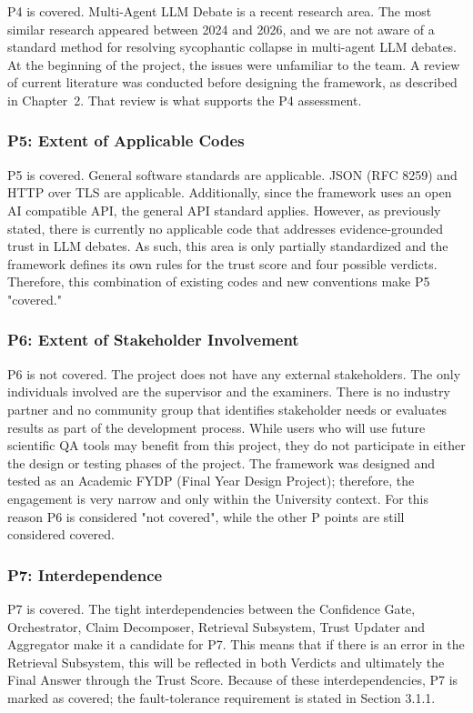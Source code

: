 P4 is covered. Multi-Agent LLM Debate is a recent research area. The most similar research appeared between 2024 and 2026, and we are not aware of a standard method for resolving sycophantic collapse in multi-agent LLM debates. At the beginning of the project, the issues were unfamiliar to the team. A review of current literature was conducted before designing the framework, as described in Chapter~2. That review is what supports the P4 assessment.

\subsubsection{P5: Extent of Applicable Codes}

P5 is covered. General software standards are applicable. JSON (RFC 8259) and HTTP over TLS are applicable. Additionally, since the framework uses an open AI compatible API, the general API standard applies. However, as previously stated, there is currently no applicable code that addresses evidence-grounded trust in LLM debates. As such, this area is only partially standardized and the framework defines its own rules for the trust score and four possible verdicts. Therefore, this combination of existing codes and new conventions make P5 "covered."

\subsubsection{P6: Extent of Stakeholder Involvement}

P6 is not covered. The project does not have any external stakeholders. The only individuals involved are the supervisor and the examiners. There is no industry partner and no community group that identifies stakeholder needs or evaluates results as part of the development process. While users who will use future scientific QA tools may benefit from this project, they do not participate in either the design or testing phases of the project. The framework was designed and tested as an Academic FYDP (Final Year Design Project); therefore, the engagement is very narrow and only within the University context. For this reason P6 is considered "not covered", while the other P points are still considered covered.

\subsubsection{P7: Interdependence}

P7 is covered. The tight interdependencies between the Confidence Gate, Orchestrator, Claim Decomposer, Retrieval Subsystem, Trust Updater and Aggregator make it a candidate for P7. This means that if there is an error in the Retrieval Subsystem, this will be reflected in both Verdicts and ultimately the Final Answer through the Trust Score. Because of these interdependencies, P7 is marked as covered; the fault-tolerance requirement is stated in Section 3.1.1.

